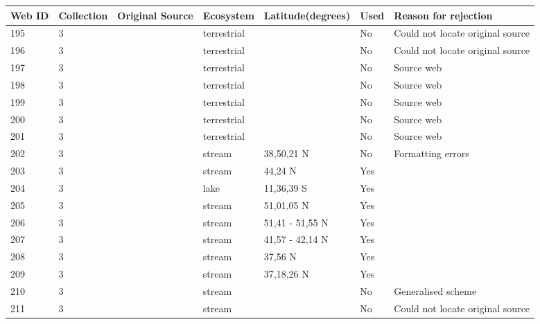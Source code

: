 \documentclass[12pt]{article}
\begin{document}
\begin{landscape}
        \newpage

    \begin{table}[h!]
    \centering
    {\footnotesize
      \begin{tabular}{p{2.8cm}p{1.3cm}p{3cm}p{2.2cm}p{2.5cm}lp{8.2cm}}
        \hline
        Web ID & Collection & Original Source & Ecosystem & Latitude(degrees) & Used  & Reason for rejection  \\
        \hline
        195   & 3 & \cite{Schoenly1983a}    & terrestrial &       & No    & Could not locate original source \\
        196   & 3 & \cite{Schoenly1983a}    & terrestrial &       & No    & Could not locate original source \\
        197   & 3 & \cite{Mohr1943}    & terrestrial &       & No    & Source web \\
        198   & 3 & \cite{Schoenly1983}  & terrestrial &       & No    & Source web \\
        199   & 3 & \cite{Valiela1969}    & terrestrial &       & No    & Source web \\
        200   & 3 & \cite{Valiela1974}    & terrestrial &       & No    & Source web \\
        201   & 3 & \cite{Valiela1974}    & terrestrial &       & No    & Source web \\
        202   & 3 & \cite{Allan1982}    & stream & 38,50,21 N & No  &  Formatting errors     \\
        203   & 3 & \cite{Collins1976}    & stream & 44,24 N & Yes   &       \\
        204   & 3 & \cite{Fryer1959} & lake  & 11,36,39 S & Yes   &       \\
        205   & 3 & \cite{Hildrew1985}     & stream & 51,01,05 N & Yes   &       \\
        206   & 3 & \cite{Jones1949}     & stream & 51,41 - 51,55 N & Yes   &       \\
        207   & 3 & \cite{Koslucher1973}    & stream & 41,57 - 42,14 N & Yes   &       \\
        208   & 3 & \cite{Minckley1963}    & stream & 37,56 N & Yes   &       \\
        209   & 3 & \cite{Minshall1967}    & stream & 37,18,26 N & Yes   &       \\
        210   & 3 & \cite{Percival1929}     & stream &       & No    & Generalised scheme \\
        211   & 3 & \cite{Ricker1935}  & stream &       & No    & Could not locate original source \\

\end{tabular}}
\end{table}
\end{landscape}
\end{document}
